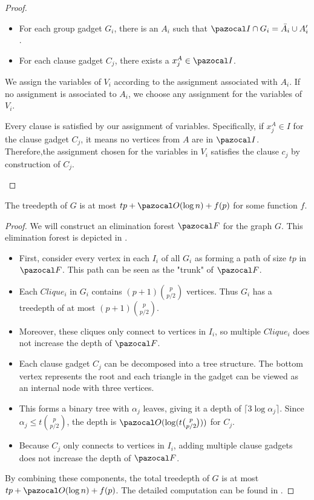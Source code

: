 \begin{proof}
\begin{itemize}
        \begin{itemize}
            \item For each group gadget $G_i$, there is an $A_i$ such that $\I \cap G_i = \bar{A_i} \cup A_i'$.
            \item For each clause gadget $C_j$, there exists a $x_j^A \in \I$.
        \end{itemize}

        We assign the variables of $V_i$ according to the assignment associated with $A_i$. If no assignment is associated to $A_i$, we choose any assignment for the variables of $V_i$.
        
        Every clause is satisfied by our assignment of variables. Specifically, if $x_j^A \in I$ for the clause gadget $C_j$, it means no vertices from $A$ are in $\I$. Therefore,the assignment chosen for the variables in $V_i$ satisfies the clause $c_j$ by construction of $C_j$.
    \end{itemize}
\end{proof}

\begin{lemma}
    \label{lemma:indset-sat-graph-td}
    The treedepth of $G$ is at most $tp + \O(\log n) + f(p)$ for some function $f$.
\end{lemma}

\begin{proof}
    We will construct an elimination forest $\F$ for the graph $G$. This elimination forest is depicted in .
    
    \begin{itemize}
        \item First, consider every vertex in each $I_i$ of all $G_i$ as forming a path of size $tp$ in $\F$. This path can be seen as the "trunk" of $\F$.
        \item  Each $Clique_i$ in $G_i$ contains $(p+1)\binom{p}{p/2}$ vertices. Thus $G_i$ has a treedepth of at most $(p+1)\binom{p}{p/2}$.
        \item Moreover, these cliques only connect to vertices in $I_i$, so multiple $Clique_i$ does not increase the depth of $\F$.
        \item Each clause gadget $C_j$ can be decomposed into a tree structure. The bottom vertex represents the root and each triangle in the gadget can be viewed as an internal node with three vertices.
        \item This forms a binary tree with $\alpha_j$ leaves, giving it a depth of $\lceil3\log{\alpha_j}\rceil$. Since $\alpha_j \leq t\binom{p}{p/2}$, the depth is $\O(\log(t\binom{p}{p/2}))$ for $C_j$.
        \item Because $C_j$ only connects to vertices in $I_i$, adding multiple clause gadgets does not increase the depth of $\F$.
    \end{itemize}

    \medskip

    By combining these components, the total treedepth of $G$ is at most $tp + \O(\log n) + f(p)$. The detailed computation can be found in .
\end{proof}

